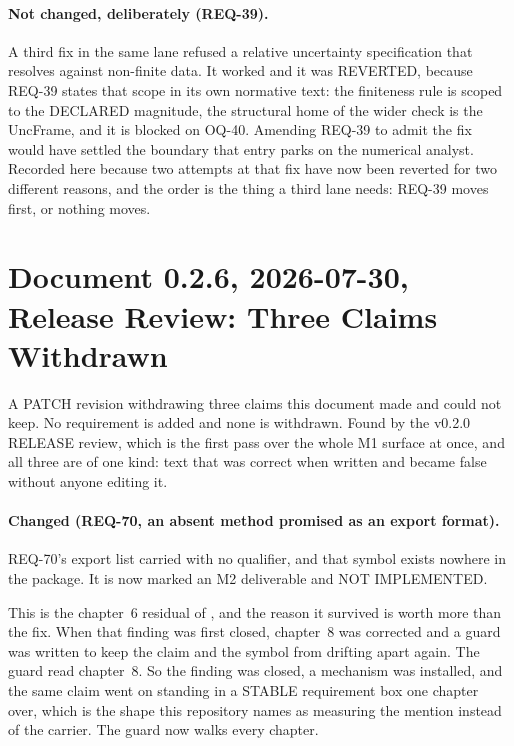 \paragraph{Not changed, deliberately (REQ-39).} A third fix in the same
lane refused a relative uncertainty specification that resolves against
non-finite data. It worked and it was REVERTED, because REQ-39 states
that scope in its own normative text: the finiteness rule is scoped to
the DECLARED magnitude, the structural home of the wider check is the
UncFrame, and it is blocked on OQ-40. Amending REQ-39 to admit the fix
would have settled the boundary that entry parks on the numerical
analyst. Recorded here because two attempts at that fix have now been
reverted for two different reasons, and the order is the thing a third
lane needs: REQ-39 moves first, or nothing moves.

\section*{Document 0.2.6, 2026-07-30, Release Review: Three Claims Withdrawn}

A PATCH revision withdrawing three claims this document made and could not
keep. No requirement is added and none is withdrawn. Found by the v0.2.0
RELEASE review, which is the first pass over the whole M1 surface at once,
and all three are of one kind: text that was correct when written and became
false without anyone editing it.

\paragraph{Changed (REQ-70, an absent method promised as an export
format).} REQ-70's export list carried
 with no qualifier,
and that symbol exists nowhere in the package. It is now marked an M2
deliverable and NOT IMPLEMENTED.

This is the chapter~6 residual of , and the reason it
survived is worth more than the fix. When that finding was first closed,
chapter~8 was corrected and a guard was written to keep the claim and the
symbol from drifting apart again. The guard read chapter~8. So the finding
was closed, a mechanism was installed, and the same claim went on standing
in a STABLE requirement box one chapter over, which is the shape this
repository names as measuring the mention instead of the carrier. The guard
now walks every chapter.

